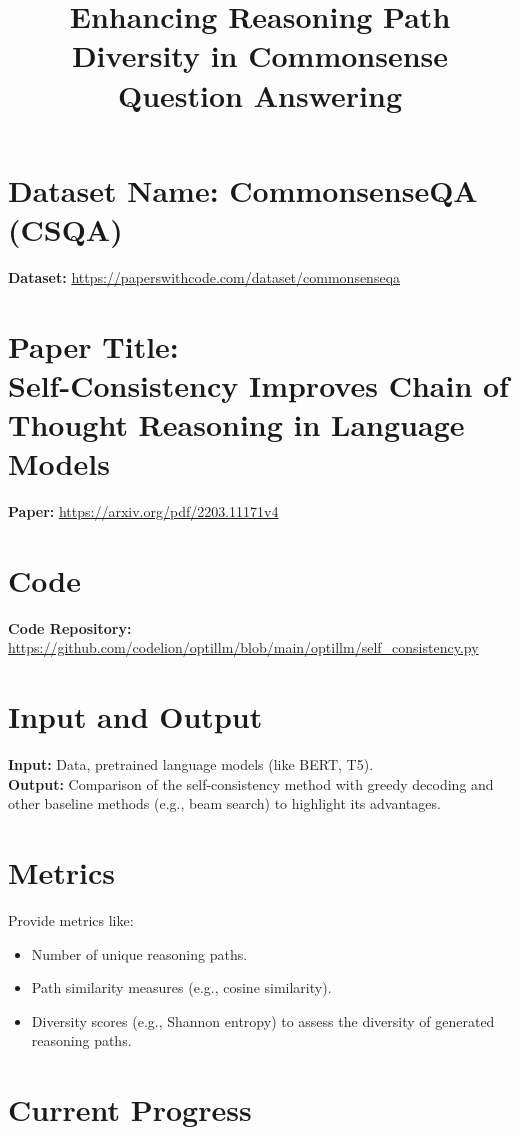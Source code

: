 \documentclass[a4paper,9pt]{article}
\begin{document}
\title{Enhancing Reasoning Path Diversity in Commonsense Question Answering}
\author{}
\date{}
\maketitle

\section*{Dataset Name: CommonsenseQA (CSQA)}
\noindent
\textbf{Dataset:} \url{https://paperswithcode.com/dataset/commonsenseqa}

\section*{Paper Title: \\
Self-Consistency Improves Chain of Thought Reasoning in Language Models}
\noindent
\textbf{Paper:} \url{https://arxiv.org/pdf/2203.11171v4}

\section*{Code}
\noindent
\textbf{Code Repository:} \url{https://github.com/codelion/optillm/blob/main/optillm/self_consistency.py}

\section*{Input and Output}
\noindent
\textbf{Input:} Data, pretrained language models (like BERT, T5). \\
\textbf{Output:} Comparison of the self-consistency method with greedy decoding and other baseline methods (e.g., beam search) to highlight its advantages.

\section*{Metrics}
\noindent
Provide metrics like:
\begin{itemize}
    \item Number of unique reasoning paths.
    \item Path similarity measures (e.g., cosine similarity).
    \item Diversity scores (e.g., Shannon entropy) to assess the diversity of generated reasoning paths.
\end{itemize}

\section*{Current Progress}
\end{document}
